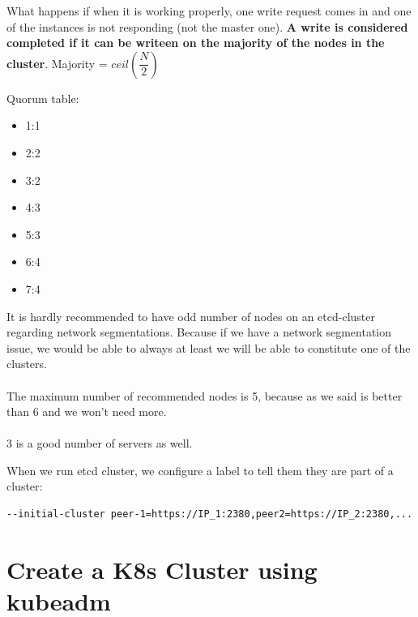 \documentclass{article}
\newenvironment{blocktemplateIII}[1]{%
    \tcolorbox[beamer,%
    noparskip,breakable,
    ,colframe=Red,%
    colbacklower=LimeGreen!75!LightGreen,%
    title=#1]}%
    {\endtcolorbox}
\newenvironment{codetemplate}[1][]{%
  \mybasecolorbox[#1]
  \itshape
}{%
  \endmybasecolorbox
}
\begin{document}
What happens if when it is working properly, one write request comes in and one of the instances is not responding (not the master one). \textbf{A write is considered completed if it can be writeen on the majority of the nodes in the cluster}. Majority = $ceil(\dfrac{N}{2})$

Quorum table:

\begin{itemize}
    \item 1:1
    \item 2:2
    \item 3:2
    \item 4:3
    \item 5:3
    \item 6:4
    \item 7:4
\end{itemize}

\begin{blocktemplateIII}{WARNING}
It is hardly recommended to have odd number of nodes on an etcd-cluster regarding network segmentations. Because if we have a network segmentation issue, we would be able to always at least we will be able to constitute one of the clusters.
\\\\
The maximum number of recommended nodes is 5, because as we said is better than 6 and we won't need more.
\\\\
3 is a good number of servers as well.
\end{blocktemplateIII}

When we run etcd cluster, we configure a label to tell them they are part of a cluster:
\begin{codetemplate}{}
\begin{verbatim}
--initial-cluster peer-1=https://IP_1:2380,peer2=https://IP_2:2380,...
\end{verbatim}
\end{codetemplate}

\newpage
\section{Create a K8s Cluster using kubeadm}
\end{document}
